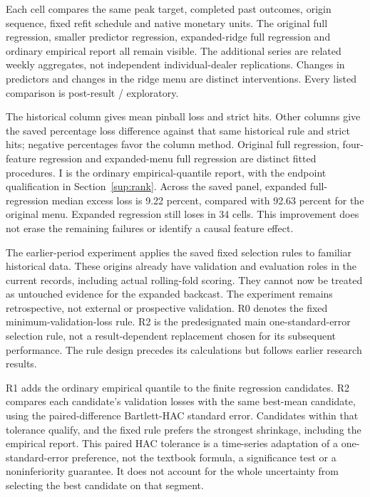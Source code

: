 \documentclass[10pt,a4paper]{article}
\begin{document}
Each cell compares the same peak target, completed past outcomes,
origin sequence, fixed refit schedule and native monetary units. The original
full regression, smaller predictor regression, expanded-ridge full regression
and ordinary empirical report all remain visible. The additional series are
related weekly aggregates, not independent individual-dealer replications.
Changes in predictors and changes in the ridge menu are distinct interventions.
Every listed comparison is post-result / exploratory.

The historical column gives mean pinball loss and strict hits. Other columns
give the saved percentage loss difference against that same historical rule and
strict hits; negative percentages favor the column method. Original full
regression, four-feature regression and expanded-menu full regression are
distinct fitted procedures.
I is the ordinary
empirical-quantile report, with the endpoint qualification in Section~\ref{sup:rank}.
Across the saved panel, expanded full-regression median excess
loss is 9.22 percent,
compared with 92.63 percent for the original menu. Expanded regression still loses in 34 cells.
This improvement does not erase the remaining failures or identify a causal
feature effect.

The earlier-period experiment applies the saved fixed selection rules
to familiar historical data. These origins already have validation and
evaluation roles in the current records, including actual rolling-fold
scoring. They cannot now be treated as untouched evidence for the expanded
backcast. The experiment remains retrospective, not external or prospective
validation. R0 denotes the fixed minimum-validation-loss rule. R2 is the predesignated main one-standard-error selection rule,
not a result-dependent replacement chosen for its subsequent performance.
The rule design precedes its calculations but follows earlier research results.

R1 adds the ordinary empirical quantile to the finite regression candidates.
R2 compares each candidate's validation losses with the same best-mean
candidate, using the paired-difference Bartlett-HAC standard error. Candidates
within that tolerance qualify, and the fixed rule prefers the strongest
shrinkage, including the empirical report. This paired HAC tolerance is a
time-series adaptation of a one-standard-error preference, not the textbook
formula, a significance test or a noninferiority guarantee. It does not account
for the whole uncertainty from selecting the best candidate on that segment.
\end{document}
